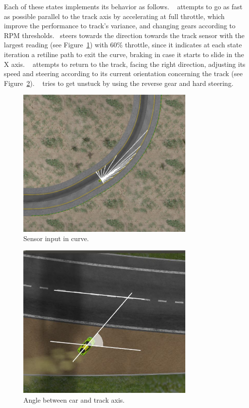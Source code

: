 Each of these states implements its behavior as follows. \SL~ attempts to go as fast as possible parallel to the track axis by accelerating at full throttle, which improve the performance to track's variance, and changing gears according to RPM thresholds. \C~steers towards the direction towards the track sensor with the largest reading (see Figure~\ref{Fig:FSensor}) with 60\% throttle, since it indicates at each state iteration a retiline path to exit the curve, braking in case it starts to slide in the X axis. \OT~ attempts to return to the track, facing the right direction, adjusting its speed and steering according to its current orientation concerning the track (see Figure~\ref{Fig:Angle}). \St~ tries to get unstuck by using the reverse gear and hard steering.

\begin{figure}[h]
	\centering
	\includegraphics[width=250pt]{FarthestSensor}
	\caption{Sensor input in curve.}
	\label{Fig:FSensor}
\end{figure}

\begin{figure}%
		\centering
		\includegraphics[width=250pt]{ReturnAngle}
		\caption{Angle between car and track axis.}
		\label{Fig:Angle}
\end{figure}

